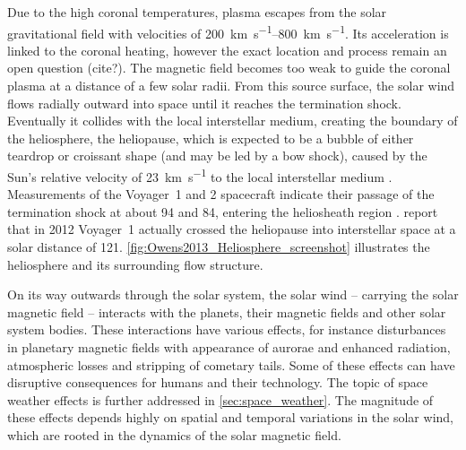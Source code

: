 Due to the high coronal temperatures, plasma escapes from the solar gravitational field \citep{Parker1958} with velocities of \SIrange{200}{800}{\km\per\s}. Its acceleration is linked to the coronal heating, however the exact location and process remain an open question (cite?). The magnetic field becomes too weak to guide the coronal plasma at a distance of a few solar radii. From this source surface, the solar wind flows radially outward into space until it reaches the termination shock. Eventually it collides with the local interstellar medium, creating the boundary of the heliosphere, the heliopause, which is expected to be a bubble of either teardrop or croissant shape (and may be led by a bow shock), caused by the Sun's relative velocity of \SI{23}{\km\per\s} to the local interstellar medium \citep{Owens2013, Opher2015}. Measurements of the Voyager~1 and 2 spacecraft indicate their passage of the termination shock at about \SI{94}{\au} and \SI{84}{\au}, entering the heliosheath region \citep{Owens2013}. \citet{Gurnett2013} report that in 2012 Voyager~1 actually crossed the heliopause into interstellar space at a solar distance of \SI{121}{\au}. \autoref{fig:Owens2013_Heliosphere_screenshot} illustrates the heliosphere and its surrounding flow structure.
\begin{figure}[htb]
\end{figure}

On its way outwards through the solar system, the solar wind -- carrying the solar magnetic field -- interacts with the planets, their magnetic fields and other solar system bodies. These interactions have various effects, for instance disturbances in planetary magnetic fields with appearance of aurorae and enhanced radiation, atmospheric losses and stripping of cometary tails. Some of these effects can have disruptive consequences for humans and their technology. The topic of space weather effects is further addressed in \autoref{sec:space_weather}. The magnitude of these effects depends highly on spatial and temporal variations in the solar wind, which are rooted in the dynamics of the solar magnetic field.

